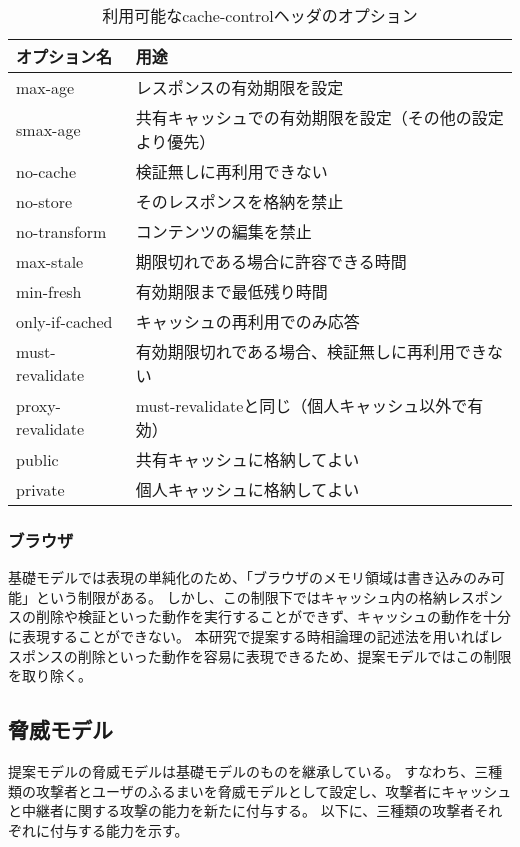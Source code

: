 \documentclass[12pt,a4paper]{jbook}
\begin{document}
\begin{table}[htb]
\centering
\caption{利用可能なcache-controlヘッダのオプション}
\label{tb:CacheControlOption}
\begin{tabular}{ll}
オプション名 & 用途 \\ \hline
max-age & レスポンスの有効期限を設定 \\
smax-age & 共有キャッシュでの有効期限を設定（その他の設定より優先） \\
no-cache & 検証無しに再利用できない \\
no-store & そのレスポンスを格納を禁止 \\
no-transform & コンテンツの編集を禁止 \\
max-stale & 期限切れである場合に許容できる時間 \\
min-fresh & 有効期限まで最低残り時間 \\
only-if-cached & キャッシュの再利用でのみ応答 \\
must-revalidate & 有効期限切れである場合、検証無しに再利用できない \\
proxy-revalidate & must-revalidateと同じ（個人キャッシュ以外で有効） \\
public & 共有キャッシュに格納してよい \\
private & 個人キャッシュに格納してよい \\
\end{tabular}
\end{table}

\subsubsection{ブラウザ}
基礎モデルでは表現の単純化のため、「ブラウザのメモリ領域は書き込みのみ可能」という制限がある。
しかし、この制限下ではキャッシュ内の格納レスポンスの削除や検証といった動作を実行することができず、キャッシュの動作を十分に表現することができない。
本研究で提案する時相論理の記述法を用いればレスポンスの削除といった動作を容易に表現できるため、提案モデルではこの制限を取り除く。

\subsection{脅威モデル}
提案モデルの脅威モデルは基礎モデルのものを継承している。
すなわち、三種類の攻撃者とユーザのふるまいを脅威モデルとして設定し、攻撃者にキャッシュと中継者に関する攻撃の能力を新たに付与する。
以下に、三種類の攻撃者それぞれに付与する能力を示す。
\end{document}
